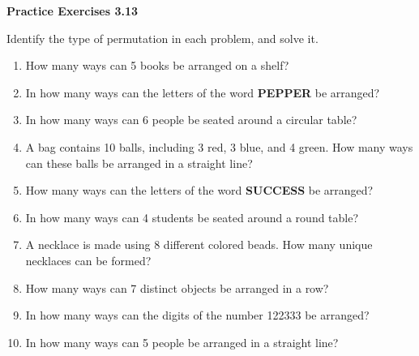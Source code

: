 \vspace{0.3ex}
\noindent\textbf{Practice Exercises 3.13}

\vspace{0.2ex}

Identify the type of permutation in each problem, and solve it.

\begin{enumerate}[label=\color{blue}\arabic*.]
    \item How many ways can 5 books be arranged on a shelf?
    \item In how many ways can the letters of the word \textbf{PEPPER} be arranged?
    \item In how many ways can 6 people be seated around a circular table?
    \item A bag contains 10 balls, including 3 red, 3 blue, and 4 green. How many ways can these balls be arranged in a straight line?
    \item How many ways can the letters of the word \textbf{SUCCESS} be arranged?
    \item In how many ways can 4 students be seated around a round table?
    \item A necklace is made using 8 different colored beads. How many unique necklaces can be formed?
    \item How many ways can 7 distinct objects be arranged in a row?
    \item In how many ways can the digits of the number 122333 be arranged?
    \item In how many ways can 5 people be arranged in a straight line?
\end{enumerate}
